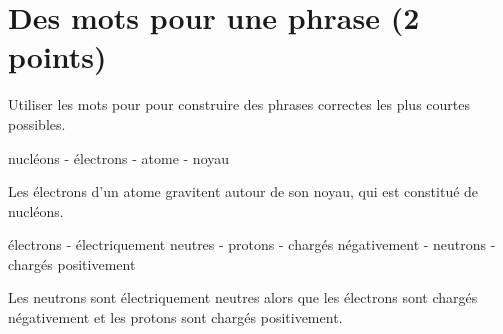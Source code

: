 \section{Des mots pour une phrase (2 points)}

Utiliser les mots pour pour construire des phrases correctes les plus courtes possibles.

\begin{questions}
	\question[1] nucléons - électrons - atome - noyau
	\begin{solution}
		Les électrons d'un atome gravitent autour de son noyau, qui est constitué de nucléons.
	\end{solution}
	
	\question[1] électrons - électriquement neutres - protons - chargés négativement - neutrons - chargés positivement
	\begin{solution}
		Les neutrons sont électriquement neutres alors que les électrons sont chargés négativement et les protons sont chargés positivement.
	\end{solution}
	
	
\end{questions}